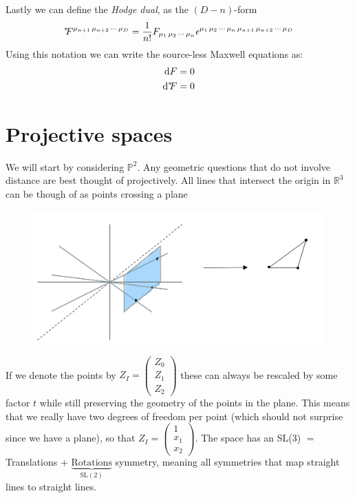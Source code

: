 \documentclass[a4paper,12pt]{article}
\begin{document}
Lastly we can define the \textit{Hodge dual}, as the $(D-n)$-form
\begin{equation}
^{*}\hspace*{-0.1cm}F^{\mu_{n+1}\,\mu_{n+2}\,\cdots\,\mu_{D}}=\frac{1}{n!}F_{\mu_1\,\mu_2\,\cdots\,\mu_n}\epsilon^{\mu_1\,\mu_2\,\cdots\,\mu_n\,\mu_{n+1}\,\mu_{n+2}\,\cdots\,\mu_D}
\end{equation}
Using this notation we can write the source-less Maxwell equations as:
\begin{equation}
\begin{aligned}
\dd F&=0\\
\dd \hodge F&=0
\end{aligned}
\end{equation}
\newpage
\section{Projective spaces}
We will start by considering $\mathds{P}^2$. Any geometric questions that do not involve distance are best thought of projectively. All lines that intersect the origin in $\mathds{R}^3$ can be though of as points crossing a plane
\begin{figure}[H]
\includegraphics[width=15cm]{projec.PNG}
\end{figure} 
If we denote the points by $Z_I=\begin{pmatrix}Z_0 \\ Z_1 \\ Z_2
\end{pmatrix}$ these can always be rescaled by some factor $t$ while still preserving the geometry of the points in the plane. This means that we really have two degrees of freedom per point (which should not surprise since we have a plane), so that $Z_I=\begin{pmatrix} 1\\ x_1 \\ x_2
\end{pmatrix}$. The space has an SL(3) $=$ Translations + $\underbrace{\text{Rotations}}_{\text{SL}(2)}$ symmetry, meaning all symmetries that map straight lines to straight lines. 
\end{document}
